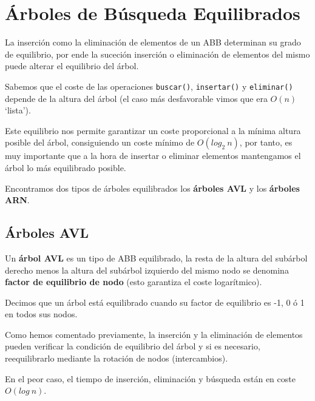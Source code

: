 \chapter{Árboles de Búsqueda Equilibrados}
La inserción como la eliminación de elementos de un ABB determinan su grado de equilibrio, por ende la suceción inserción o eliminación de elementos del mismo puede alterar el equilibrio del árbol.

Sabemos que el coste de las operaciones \texttt{buscar()}, \texttt{insertar()} y \texttt{eliminar()} depende de la altura del árbol (el caso más desfavorable vimos que era \(O(n)\) `lista').

Este equilibrio nos permite garantizar un coste proporcional a la mínima altura posible del árbol, consiguiendo un coste mínimo de \(O(log_{2}\ n)\), por tanto, es muy importante que a la hora de insertar o eliminar elementos mantengamos el árbol lo más equilibrado posible.

Encontramos dos tipos de árboles equilibrados los \textbf{árboles AVL} y los \textbf{árboles ARN}.

\section{Árboles AVL}
Un \textbf{árbol AVL} es un tipo de ABB equilibrado, la resta de la altura del subárbol derecho menos la altura del subárbol izquierdo del mismo nodo se denomina \textbf{factor de equilibrio de nodo} (esto garantiza el coste logarítmico).

Decimos que un árbol está equilibrado cuando su factor de equilibrio es -1, 0 ó 1 en todos sus nodos.

Como hemos comentado previamente, la inserción y la eliminación de elementos pueden verificar la condición de equilibrio del árbol y si es necesario, reequilibrarlo mediante la rotación de nodos (intercambios).

En el peor caso, el tiempo de inserción, eliminación y búsqueda están en coste \(O(log\ n)\).
